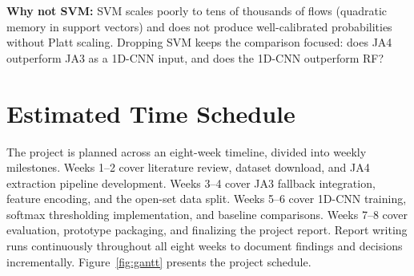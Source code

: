 \documentclass[12pt,a4paper]{report}
\begin{document}
\textbf{Why not SVM:} SVM scales poorly to tens of thousands of flows (quadratic memory in support vectors) and does not produce well-calibrated probabilities without Platt scaling. Dropping SVM keeps the comparison focused: does JA4 outperform JA3 as a 1D-CNN input, and does the 1D-CNN outperform RF?

\section{Estimated Time Schedule}
\label{sec:schedule}

The project is planned across an eight-week timeline, divided into weekly milestones. Weeks 1--2 cover literature review, dataset download, and JA4 extraction pipeline development. Weeks 3--4 cover JA3 fallback integration, feature encoding, and the open-set data split. Weeks 5--6 cover 1D-CNN training, softmax thresholding implementation, and baseline comparisons. Weeks 7--8 cover evaluation, prototype packaging, and finalizing the project report. Report writing runs continuously throughout all eight weeks to document findings and decisions incrementally. Figure~\ref{fig:gantt} presents the project schedule.
\end{document}
